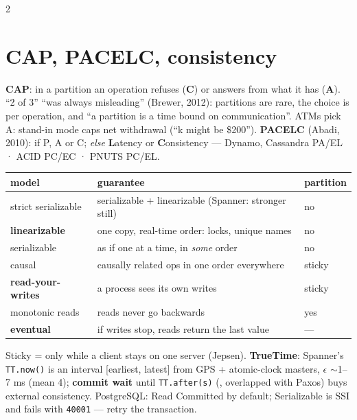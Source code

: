 \documentclass[8pt]{extarticle}
\newcommand\ct[1]{\texttt{#1}}
\begin{document}
\begin{multicols}{2}
\section{CAP, PACELC, consistency}
\textbf{CAP}: in a partition an operation refuses (\textbf{C}) or answers from what it has
(\textbf{A}). ``2 of 3'' ``was always misleading'' (Brewer, 2012): partitions are rare, the
choice is per operation, and ``a partition is a time bound on communication''. ATMs pick A:
stand-in mode caps net withdrawal (``k might be \$200''). \textbf{PACELC} (Abadi, 2010): if P, A or
C; \emph{else} \textbf{L}atency or \textbf{C}onsistency — Dynamo, Cassandra PA/EL · ACID PC/EC ·
PNUTS PC/EL.
{\scriptsize\setlength{\tabcolsep}{3pt}
\begin{tabular}{@{}>{\raggedright\arraybackslash}p{19mm}>{\raggedright\arraybackslash}p{46mm}>{\raggedright\arraybackslash}p{9mm}@{}}
\toprule
\textbf{model} & \textbf{guarantee} & \textbf{partition}\\
\midrule
strict serializable & serializable + linearizable (Spanner: stronger still) & \textcolor{sheetRed}{no}\\
\textbf{linearizable} & one copy, real-time order: locks, unique names & \textcolor{sheetRed}{no}\\
serializable & as if one at a time, in \emph{some} order & \textcolor{sheetRed}{no}\\
causal & causally related ops in one order everywhere & \textcolor{sheetOrange}{sticky}\\
\textbf{read-your-writes} & a process sees its own writes & \textcolor{sheetOrange}{sticky}\\
monotonic reads & reads never go backwards & \textcolor{sheetGreen}{yes}\\
\textbf{eventual} & if writes stop, reads return the last value & —\\
\bottomrule
\end{tabular}}\par
Sticky = only while a client stays on one server (Jepsen). \textbf{TrueTime}: Spanner's
\ct{TT.now()} is an interval [earliest, latest] from GPS + atomic-clock masters, $\epsilon$
$\sim$1–7 ms (mean 4); \textbf{commit wait} until \ct{TT.after(s)} (\pdfonly{$\geq 2\bar{\epsilon}$}, overlapped
with Paxos) buys external consistency. PostgreSQL: Read Committed by default; Serializable is SSI
and fails with \ct{40001} — retry the transaction.


\end{multicols}
\end{document}

